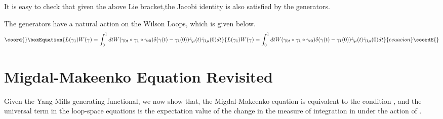 \documentclass[a4paper,12]{article}
\begin{document}
It is easy to check that given the above Lie bracket,the Jacobi identity 
is 
also satisfied by the 
generators.

The generators have a natural action on the Wilson Loops, which is given 
below.
\begin{equation}\coord{}\boxEquation{
L(\gamma _1)W(\gamma ) = \int _0 ^1 dt W(\gamma _{0t}\circ \gamma_1\circ 
\gamma_{t0})\delta (\gamma (t) - \gamma _1(0))\dot{\gamma }_\mu 
(t)\dot{\gamma }_{1\mu }(0)dt
}{
L(\gamma _1)W(\gamma ) = \int _0 ^1 dt W(\gamma _{0t}\circ \gamma_1\circ 
\gamma_{t0})\delta (\gamma (t) - \gamma _1(0))\dot{\gamma }_\mu 
(t)\dot{\gamma }_{1\mu }(0)dt
}{ecuacion}\coordE{}\end{equation}

\section{Migdal-Makeenko Equation Revisited}
Given the Yang-Mills generating functional, we now show that, the 
Migdal-Makeenko equation is equivalent to the condition \coordHE{}, 
and the universal term in the loop-space equations is the expectation value 
of the change in the measure of integration in \coordHE{} under the action of 
\coordHE{}.\\
\end{document}
